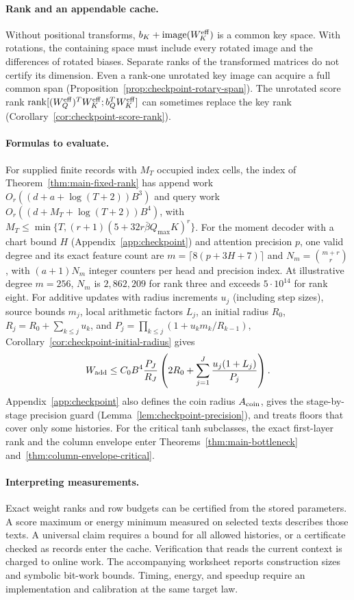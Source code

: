 \paragraph{Rank and an appendable cache.}
Without positional transforms, $b_K+\operatorname{image}(W_K^{\rm eff})$
is a common key space. With rotations, the containing space must
include every rotated image and the differences of rotated biases.
Separate ranks of the transformed matrices do not certify its dimension.
Even a rank-one unrotated key image can acquire a full common span
(Proposition~\ref{prop:checkpoint-rotary-span}). The unrotated score
rank $\operatorname{rank}[(W_Q^{\rm eff})^TW_K^{\rm eff};
b_Q^TW_K^{\rm eff}]$ can sometimes replace the key rank
(Corollary~\ref{cor:checkpoint-score-rank}).

\paragraph{Formulas to evaluate.}
For supplied finite records with $M_T$ occupied index cells, the index
of Theorem~\ref{thm:main-fixed-rank} has append work
$O_r((d+a+\log(T+2))B^3)$ and query work
$O_r((d+M_T+\log(T+2))B^4)$, with
$M_T\le\min\{T,(r+1)(5+32r\bar\beta Q_{\max}K)^r\}$.
For the moment decoder with a chart bound $H$
(Appendix~\ref{app:checkpoint}) and attention precision $p$, one valid
degree and its exact feature count are $m=\lceil8(p+3H+7)\rceil$ and
$N_m=\binom{m+r}{r}$, with $(a+1)N_m$ integer counters per head and
precision index. At illustrative degree $m=256$, $N_m$ is
$2{,}862{,}209$ for rank three and exceeds $5\cdot10^{14}$ for rank
eight. For additive updates with radius increments $u_j$ (including
step sizes), source bounds $m_j$, local arithmetic factors $L_j$, an
initial radius $R_0$, $R_j=R_0+\sum_{k\le j}u_k$, and
$P_j=\prod_{k\le j}(1+u_km_k/R_{k-1})$,
Corollary~\ref{cor:checkpoint-initial-radius} gives
\[
 W_{\rm add}\le C_0B^4\frac{P_J}{R_J}
 \left(2R_0+\sum_{j=1}^J\frac{u_j(1+L_j)}{P_j}\right).
\]
Appendix~\ref{app:checkpoint} also defines the coin radius
$A_{\rm coin}$, gives the stage-by-stage precision guard
(Lemma~\ref{lem:checkpoint-precision}), and treats floors that cover
only some histories. For the critical tanh subclasses, the exact
first-layer rank and the column envelope enter
Theorems~\ref{thm:main-bottleneck} and~\ref{thm:column-envelope-critical}.

\paragraph{Interpreting measurements.}
Exact weight ranks and row budgets can be certified from the stored
parameters. A score maximum or energy minimum measured on selected
texts describes those texts. A universal claim requires a bound for
all allowed histories, or a certificate checked as records enter the
cache. Verification that reads the current context is charged to
online work. The accompanying worksheet reports construction sizes
and symbolic bit-work bounds. Timing, energy, and speedup require
an implementation and calibration at the same target law.
